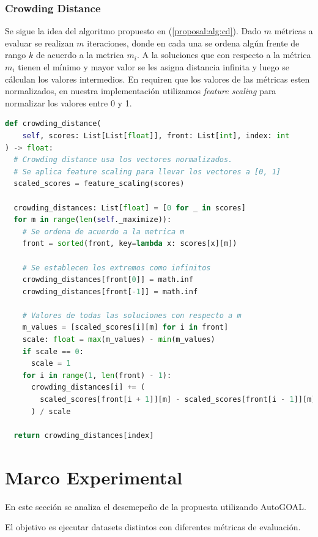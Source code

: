 \subsubsection{Crowding Distance}
Se sigue la idea del algoritmo propuesto en (\ref{proposal:alg:cd}). Dado $m$ m\'etricas a evaluar se realizan $m$ iteraciones, donde en cada una se ordena alg\'un frente de rango $k$ de acuerdo a la metrica $m_i$. A la soluciones que con respecto a la m\'etrica $m_i$ tienen el m\'inimo y mayor valor se les asigna distancia infinita y luego se c\'alculan los valores intermedios. En \cite{deb2002fast} requiren que los valores de las m\'etricas esten normalizados, en nuestra implementaci\'on utilizamos \textit{feature scaling} para normalizar los valores entre 0 y 1.

\begin{lstlisting}[language=Python]
def crowding_distance(
    self, scores: List[List[float]], front: List[int], index: int
) -> float:
  # Crowding distance usa los vectores normalizados.
  # Se aplica feature scaling para llevar los vectores a [0, 1]
  scaled_scores = feature_scaling(scores)

  crowding_distances: List[float] = [0 for _ in scores]
  for m in range(len(self._maximize)):
    # Se ordena de acuerdo a la metrica m
    front = sorted(front, key=lambda x: scores[x][m])

    # Se establecen los extremos como infinitos
    crowding_distances[front[0]] = math.inf
    crowding_distances[front[-1]] = math.inf

    # Valores de todas las soluciones con respecto a m 
    m_values = [scaled_scores[i][m] for i in front]
    scale: float = max(m_values) - min(m_values)
    if scale == 0:
      scale = 1
    for i in range(1, len(front) - 1):
      crowding_distances[i] += (
        scaled_scores[front[i + 1]][m] - scaled_scores[front[i - 1]][m]
      ) / scale

  return crowding_distances[index]
\end{lstlisting}

\section{Marco Experimental}

En este secci\'on se analiza el desemepe\~no de la propuesta utilizando AutoGOAL.

El objetivo es ejecutar datasets distintos con diferentes m\'etricas de evaluaci\'on.

